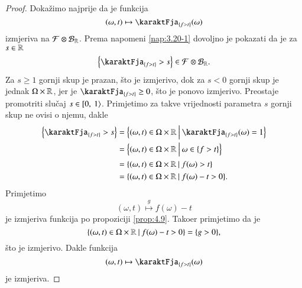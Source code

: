 \begin{proof}
    Doka\v zimo najprije da je funkcija
    \begin{equation*}
        (\omega, t) \mapsto \karaktFja_{\{ f > t \}} (\omega)
    \end{equation*}
    izmjeriva na $\mathcal{F} \otimes \mathcal{B}_{\mathbb{R}}$.
    Prema napomeni \ref{nap:3.20-1} dovoljno je pokazati da je za $s \in \mathbb{R}$
    \begin{equation*}
        \Big\{\karaktFja_{\{f > t\}} > s \Big\} \in \famF \otimes \borel{\real}.
    \end{equation*}
    Za $s \geq 1$ gornji skup je prazan, \v sto je izmjerivo, dok za $s < 0$ gornji skup je jednak $\Omega \times \mathbb{R}$, jer je $\karaktFja_{\{ f > t \}} \geq 0$, \v sto je ponovo izmjerivo.
    Preostaje promotriti slu\v caj $s \in [ {0}, \: {1} \rangle$.
    Primjetimo za takve vrijednosti parametra $s$ gornji skup ne ovisi o njemu, dakle
    \begin{equation*}
        \begin{aligned}
            \Big\{ \karaktFja_{\{f > t\}} > s \Big\} &= \bigSkup{(\omega, t) \in \Omega \times \real}{\karaktFja_{\{ f > t \}} (\omega) = 1}\\
            &= \bigSkup{(\omega, t) \in \Omega \times \real}{\omega \in \{ f > t \}}\\
            &= \skup{(\omega, t) \in \Omega \times \real}{f(\omega) > t}\\
            &= \skup{(\omega, t) \in \Omega \times \real}{f(\omega) - t > 0}.
        \end{aligned}
    \end{equation*}
    Primjetimo
    \begin{equation*}
        (\omega, t) \overset{g}{\mapsto} f(\omega) - t
    \end{equation*}
    je izmjeriva funkcija po propoziciji \ref{prop:4.9}.
    Tako\dj er primjetimo da je
    \begin{equation*}
        \{{(\omega, t) \in \Omega \times \mathbb{R}} \: | \: {f(\omega) - t > 0}\} = \{ g > 0 \},
    \end{equation*}
    \v sto je izmjerivo.
    Dakle funkcija
    \begin{equation*}
        (\omega, t) \mapsto \karaktFja_{\{ f > t \}} (\omega)
    \end{equation*}
    je izmjeriva.


\end{proof}
